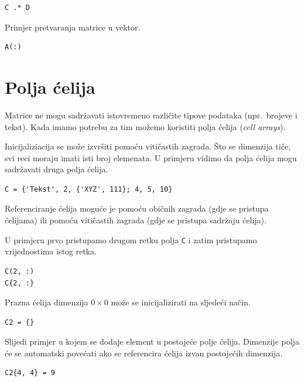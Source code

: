 \documentclass[a4paper, 10pt]{article}
\newcommand{\spec}[1]{\texttt{#1}} %
\newcommand{\eng}[1]{\emph{#1}} %
\begin{document}
\begin{lstlisting}
C .* D
\end{lstlisting}

Primjer pretvaranja matrice u vektor.

\begin{lstlisting}
A(:)
\end{lstlisting}


\section{Polja ćelija}

Matrice ne mogu sadržavati istovremeno različite tipove podataka (npr.\ brojeve i tekst).
Kada imamo potrebu za tim možemo koristiti polja ćelija (\eng{cell arrays}).

Inicijaliziacija se može izvršiti pomoću vitičastih zagrada.
Što se dimenzija tiče, svi reci moraju imati isti broj elemenata.
U primjeru vidimo da polja ćelija mogu sadržavati druga polja ćelija.

\begin{lstlisting}
C = {'Tekst', 2, {'XYZ', 111}; 4, 5, 10}
\end{lstlisting}

Referenciranje ćelija moguće je pomoću običnih zagrada (gdje se pristupa ćelijama) ili pomoću vitičastih zagrada (gdje se pristupa sadržaju ćelija).

U primjeru prvo pristupamo drugom retku polja \spec{C} i zatim pristupamo vrijednostima istog retka.

\begin{lstlisting}
C(2, :)
C{2, :}
\end{lstlisting}

Prazna ćelija dimenzija $0 \times 0$ može se inicijalizirati na sljedeći način.

\begin{lstlisting}
C2 = {}
\end{lstlisting}

Slijedi primjer u kojem se dodaje element u postojeće polje ćelija.
Dimenzije polja će se automatski povećati ako se referencira ćelija izvan postojećih dimenzija.

\begin{lstlisting}
C2{4, 4} = 9
\end{lstlisting}
\end{document}
